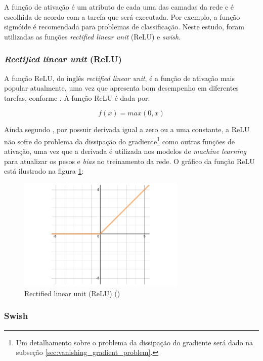 A função de ativação é um atributo de cada uma das camadas 
da rede e é escolhida de acordo com a tarefa que será 
executada. Por exemplo, a função sigmóide é recomendada
 para problemas de classificação. Neste estudo, 
foram utilizadas as funções \textit{rectified linear unit} (ReLU) e \textit{swish}.

\subsubsection{\textit{Rectified linear unit} (ReLU)}

A função ReLU, do inglês \textit{rectified linear unit}, é a
função de ativação mais popular atualmente, uma vez que apresenta bom desempenho 
em diferentes tarefas, conforme \citet{dl-oreilly}. A função ReLU é dada por:

\begin{equation}
  f(x) = max(0,x)
\end{equation}

Ainda segundo \citet{dl-oreilly}, por possuir derivada igual a zero ou a uma constante, a ReLU não sofre do problema da dissipação do gradiente\footnote{Um 
detalhamento sobre o problema da dissipação do gradiente será dado na subseção \ref{sec:vanishing_gradient_problem}.} como
outras funções de ativação, 
uma vez que a derivada é utilizada nos modelos de \textit{machine learning}
para atualizar os pesos e \textit{bias} no treinamento da rede.
O gráfico da função ReLU está ilustrado na figura \ref{fig:relu}:

\begin{figure}[H] 
  \includegraphics[width= 8cm]{../figuras/relu.png}
  \caption{Rectified linear unit (ReLU) (\cite{dl-oreilly})}
  \label{fig:relu}
\end{figure}

\subsubsection{Swish}

